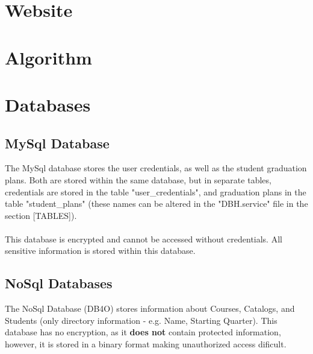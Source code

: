 \documentclass[letterpaper]{report}
\begin{document}
	\chapter{Website}
	\chapter{Algorithm}
	\chapter{Databases}
	\section{MySql Database}
	The MySql database stores the user credentials, as well as the student graduation plans. Both are stored within the same database, but in separate tables, credentials are stored in the table "user\_credentials", and graduation plans in the table "student\_plans" (these names can be altered in the "DBH.service" file in the section [TABLES]).\\ \\This database is encrypted and cannot be accessed without credentials. All sensitive information is stored within this database.
	\section{NoSql Databases}
	The NoSql Database (DB4O) stores information about Courses, Catalogs, and Students (only directory information - e.g. Name, Starting Quarter). This database has no encryption, as it \textbf{does not} contain protected information, however, it is stored in a binary format making unauthorized access dificult.
\end{document}
